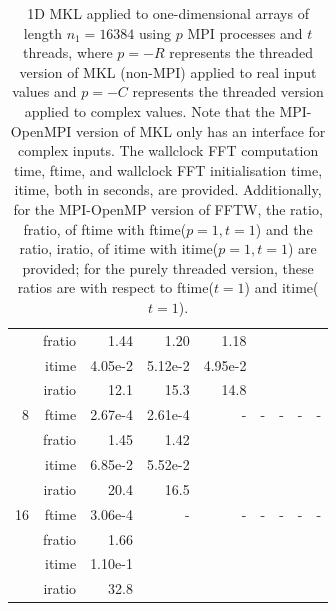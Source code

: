 \documentclass[a4]{article}
\begin{document}
\begin{table}
\begin{center}
\begin{tabular}{|r|r|r|r|r|r|r|r|r|}
      & fratio &   1.44 &   1.20 &   1.18 &     &  &  &  \\
      & itime &    4.05e-2 &   5.12e-2 &   4.95e-2 &     & & & \\
      & iratio &     12.1 &   15.3 &   14.8 &   & & &  \\ \hline
    8  & ftime &    2.67e-4 &   2.61e-4 &     - & - & - & - & - \\ 
      & fratio &     1.45 &   1.42 &     &  &  &  &  \\
      & itime &   6.85e-2 &   5.52e-2 &         & & & & \\
      & iratio &    20.4 &   16.5 &       & & & & \\ \hline
    16 & ftime  &     3.06e-4 &    - & - & - & - & - & - \\ 
     & fratio &      1.66 &    &  &  &  &  &  \\
      & itime &      1.10e-1 &   & & & & & \\
      & iratio &    32.8 &     & & & & & \\ \hline
\end{tabular}
\caption{1D MKL applied to one-dimensional arrays of length $n_1=16384$ using $p$ MPI processes and $t$ threads, where $p=-R$ represents the threaded version of MKL (non-MPI) applied to real input values and $p=-C$ represents the threaded version applied to complex values. Note that the MPI-OpenMPI version of MKL only has an interface for complex inputs. The wallclock FFT computation time, ftime, and wallclock FFT initialisation time, itime, both in seconds, are provided. Additionally, for the MPI-OpenMP version of FFTW, the ratio, fratio, of ftime  with ftime($p=1,t=1$) and the ratio, iratio, of itime  with itime($p=1,t=1$) are provided; for the purely threaded version, these ratios are with respect to ftime($t=1$) and itime($t=1$).  }\label{Tbl:MKL1d16384}
\end{center}
\end{table}
\end{document}
